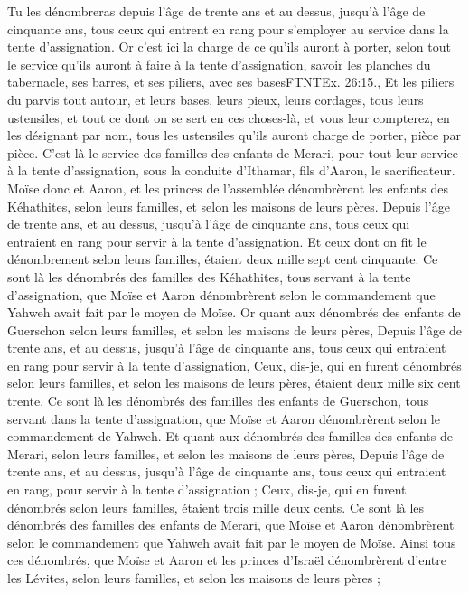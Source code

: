 \begin{multicols}{2}
Tu les dénombreras depuis l'âge de trente ans et au dessus, jusqu'à l'âge de cinquante ans, tous ceux qui entrent en rang pour s'employer au service dans la tente d'assignation.
Or c'est ici la charge de ce qu'ils auront à porter, selon tout le service qu'ils auront à faire à la tente d'assignation, savoir les planches du tabernacle, ses barres, et ses piliers, avec ses basesFTNT{Ex. 26:15.},
Et les piliers du parvis tout autour, et leurs bases, leurs pieux, leurs cordages, tous leurs ustensiles, et tout ce dont on se sert en ces choses-là, et vous leur compterez, en les désignant par nom, tous les ustensiles qu'ils auront charge de porter, pièce par pièce.
C'est là le service des familles des enfants de Merari, pour tout leur service à la tente d'assignation, sous la conduite d'Ithamar, fils d'Aaron, le sacrificateur.
Moïse donc et Aaron, et les princes de l'assemblée dénombrèrent les enfants des Kéhathites, selon leurs familles, et selon les maisons de leurs pères.
Depuis l'âge de trente ans, et au dessus, jusqu'à l'âge de cinquante ans, tous ceux qui entraient en rang pour servir à la tente d'assignation.
Et ceux dont on fit le dénombrement selon leurs familles, étaient deux mille sept cent cinquante.
Ce sont là les dénombrés des familles des Kéhathites, tous servant à la tente d'assignation, que Moïse et Aaron dénombrèrent selon le commandement que Yahweh avait fait par le moyen de Moïse.
Or quant aux dénombrés des enfants de Guerschon selon leurs familles, et selon les maisons de leurs pères,
Depuis l'âge de trente ans, et au dessus, jusqu'à l'âge de cinquante ans, tous ceux qui entraient en rang pour servir à la tente d'assignation,
Ceux, dis-je, qui en furent dénombrés selon leurs familles, et selon les maisons de leurs pères, étaient deux mille six cent trente.
Ce sont là les dénombrés des familles des enfants de Guerschon, tous servant dans la tente d'assignation, que Moïse et Aaron dénombrèrent selon le commandement de Yahweh.
Et quant aux dénombrés des familles des enfants de Merari, selon leurs familles, et selon les maisons de leurs pères,
Depuis l'âge de trente ans, et au dessus, jusqu'à l'âge de cinquante ans, tous ceux qui entraient en rang, pour servir à la tente d'assignation ;
Ceux, dis-je, qui en furent dénombrés selon leurs familles, étaient trois mille deux cents.
Ce sont là les dénombrés des familles des enfants de Merari, que Moïse et Aaron dénombrèrent selon le commandement que Yahweh avait fait par le moyen de Moïse.
Ainsi tous ces dénombrés, que Moïse et Aaron et les princes d'Israël dénombrèrent d'entre les Lévites, selon leurs familles, et selon les maisons de leurs pères ;

\end{multicols}
